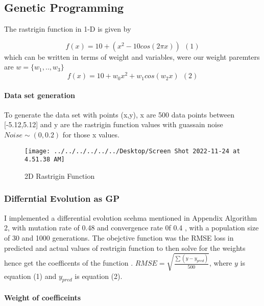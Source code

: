 \documentclass[
]{article}
\begin{document}
\newpage

\hypertarget{genetic-programming}{%
\subsection{Genetic Programming}\label{genetic-programming}}

The rastrigin function in 1-D is given by

\[
f(x)=10 + (x^2- 10cos(2\pi x)) \:\:(1)
\] which can be written in terms of weight and variables, were our
weight paremters are \(w=\{w_1,..,w_3\}\) \[
f(x)=10+w_0x^2+w_1cos(w_2x)\:\:(2)
\]

\hypertarget{data-set-generation}{%
\paragraph{Data set generation}\label{data-set-generation}}

To generate the data set with points (x,y), x are 500 data points
between {[}-5.12,5.12{]} and y are the rastrigin function values with
guassain noise \(Noise\sim(0,0.2)\) for those x values.

\begin{figure}[H]

{\centering \texttt{[image: ../../../../../../Desktop/Screen Shot 2022-11-24 at 4.51.38 AM]} 

}

\caption{2D Rastrigin Function \label{fig:DEpredict}}\label{fig:DEpredict}
\end{figure}

\hypertarget{differntial-evolution-as-gp}{%
\subsubsection{Differntial Evolution as
GP}\label{differntial-evolution-as-gp}}

I implemented a differential evolution scehma mentioned in Appendix
Algorithm 2, with mutation rate of 0.48 and convergence rate 0f 0.4 ,
with a population size of 30 and 1000 generations. The obejctive
function was the RMSE loss in predicted and actual values of restrigin
function to then solve for the weights hence get the coefficents of the
function . \(RMSE=\sqrt{\frac{\sum(y-y_{pred})}{500}}\), where \(y\) is
equation (1) and \(y_{pred}\) is equation (2).

\hypertarget{weight-of-coefficeints}{%
\paragraph{Weight of coefficeints}\label{weight-of-coefficeints}}
\end{document}

